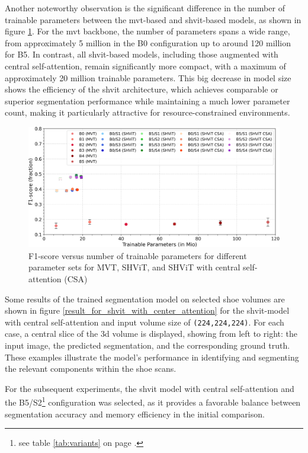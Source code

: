 Another noteworthy observation is the significant difference in the number of trainable parameters between the \gls{mvt}-based and \gls{shvit}-based models, as shown in figure \ref{iou_vs_train_parameters}. For the \gls{mvt} backbone, the number of parameters spans a wide range, from approximately 5 million in the B0 configuration up to around 120 million for B5. In contrast, all \gls{shvit}-based models, including those augmented with central self-attention, remain significantly more compact, with a maximum of approximately 20 million trainable parameters. This big decrease in model size shows the efficiency of the \gls{shvit} architecture, which achieves comparable or superior segmentation performance while maintaining a much lower parameter count, making it particularly attractive for resource-constrained environments.
\begin{figure}[H]
	\centering
	\includegraphics[width=1.0\textwidth]{./images/F1_vs_train_parameters.png}
	\caption[F1-score versus number of trainable parameters]{F1-score versus number of trainable parameters for different parameter sets for MVT, SHViT, and SHViT with central self-attention (CSA)}
	\label{iou_vs_train_parameters}
\end{figure}

Some results of the trained segmentation model on selected shoe volumes are shown in figure \ref{result_for_shvit_with_center_attention} for the \gls{shvit}-model with central self-attention and input volume size of {\tt (224,224,224)}. For each case, a central slice of the \gls{3d} volume is displayed, showing from left to right: the input image, the predicted segmentation, and the corresponding ground truth. These examples illustrate the model's performance in identifying and segmenting the relevant components within the shoe scans.

\medskip

For the subsequent experiments, the \gls{shvit} model with central self-attention and the B5/S2\footnote{see table \ref{tab:variants} on page \pageref{tab:variants}.} configuration was selected, as it provides a favorable balance between segmentation accuracy and memory efficiency in the initial comparison.

